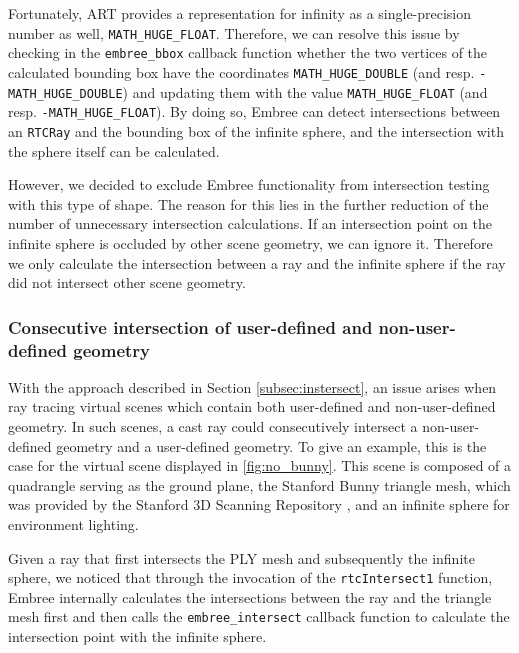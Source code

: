 Fortunately, ART provides a representation for infinity as a single-precision number as well, \texttt{MATH\_HUGE\_FLOAT}. Therefore, we can resolve this issue by checking in the \texttt{embree\_bbox} callback function whether the two vertices of the calculated bounding box have the coordinates \texttt{MATH\_HUGE\_DOUBLE} (and resp. \texttt{-MATH\_HUGE\_DOUBLE}) and updating them with the value \texttt{MATH\_HUGE\_FLOAT} (and resp. \texttt{-MATH\_HUGE\_FLOAT}). By doing so, Embree can detect intersections between an \texttt{RTCRay} and the bounding box of the infinite sphere, and the intersection with the sphere itself can be calculated.

However, we decided to exclude Embree functionality from intersection testing with this type of shape. The reason for this lies in the further reduction of the number of unnecessary intersection calculations. If an intersection point on the infinite sphere is occluded by other scene geometry, we can ignore it. Therefore we only calculate the intersection between a ray and the infinite sphere if the ray did not intersect other scene geometry.

\subsubsection{Consecutive intersection of user-defined and non-user-defined geometry}

With the approach described in Section \ref{subsec:instersect}, an issue arises when ray tracing virtual scenes which contain both user-defined and non-user-defined geometry. In such scenes, a cast ray could consecutively intersect a non-user-defined geometry and a user-defined geometry. To give an example, this is the case for the virtual scene displayed in \ref{fig:no_bunny}. This scene is composed of a quadrangle serving as the ground plane, the Stanford Bunny triangle mesh, which was provided by the Stanford 3D Scanning Repository \cite{plyRepo}, and an infinite sphere for environment lighting.

Given a ray that first intersects the PLY mesh and subsequently the infinite sphere, we noticed that through the invocation of the \texttt{rtcIntersect1} function, Embree internally calculates the intersections between the ray and the triangle mesh first and then calls the \texttt{embree\_intersect} callback function to calculate the intersection point with the infinite sphere.


